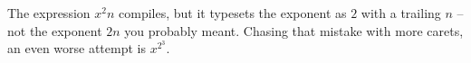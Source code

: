 \documentclass{article}
\begin{document}
The expression $x^2n$ compiles, but it typesets the exponent as $2$
with a trailing $n$ -- not the exponent $2n$ you probably meant.
Chasing that mistake with more carets, an even worse attempt is
$x^2^3$.
\end{document}
